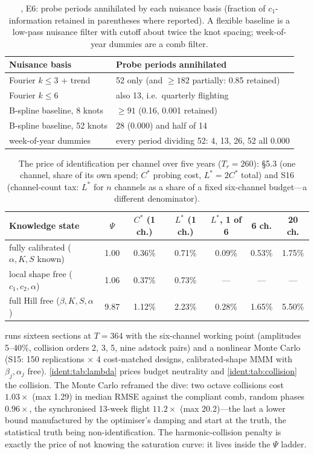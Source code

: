 \begin{table}[htbp]
\centering\small
\caption{, E6: probe periods annihilated by each nuisance basis (fraction of $c_1$-information retained in parentheses where reported). A flexible baseline is a low-pass nuisance filter with cutoff about twice the knot spacing; week-of-year dummies are a comb filter.}
\label{ident:tab:basis}
\begin{tabularx}{\textwidth}{lX}
\toprule
Nuisance basis & Probe periods annihilated \\
\midrule
Fourier $k \le 3$ + trend & 52 only (and $\ge 182$ partially: 0.85 retained) \\
Fourier $k \le 6$ & also 13, i.e.\ quarterly flighting \\
B-spline baseline, 8 knots & $\ge 91$ (0.16, 0.001 retained) \\
B-spline baseline, 52 knots & 28 (0.000) and half of 14 \\
week-of-year dummies & every period dividing 52: 4, 13, 26, 52 all 0.000 \\
\bottomrule
\end{tabularx}
\end{table}

\begin{table}[htbp]
\centering\small
\caption{The price of identification per channel over five years ($T_r = 260$):  \S5.3 (one channel, share of its own spend; $C^*$ probing cost, $L^* = 2C^*$ total) and  S16 (channel-count tax: $L^*$ for $n$ channels as a share of a fixed six-channel budget---a different denominator).}
\label{ident:tab:price}
\begin{tabular}{lcccccc}
\toprule
Knowledge state & $\Psi$ & $C^*$ (1 ch.) & $L^*$ (1 ch.) & $L^*$, 1 of 6 & 6 ch. & 20 ch. \\
\midrule
fully calibrated ($\alpha, K, S$ known) & 1.00 & 0.36\% & 0.71\% & 0.09\% & 0.53\% & 1.75\% \\
local shape free ($c_1, c_2, \alpha$) & 1.06 & 0.37\% & 0.73\% & --- & --- & --- \\
full Hill free ($\beta, K, S, \alpha$) & 9.87 & 1.12\% & 2.23\% & 0.28\% & 1.65\% & 5.50\% \\
\bottomrule
\end{tabular}
\end{table}

\emph{} runs sixteen sections at $T = 364$ with the six-channel working point (amplitudes 5--40\%, collision orders 2, 3, 5, nine adstock pairs) and a nonlinear Monte Carlo (S15: 150 replications $\times$ 4 cost-matched designs, calibrated-shape MMM with $\beta_j, \alpha_j$ free). \cref{ident:tab:lambda} prices budget neutrality and \cref{ident:tab:collision} the collision. The Monte Carlo reframed the dive: two octave collisions cost $1.03\times$ (max 1.29) in median RMSE against the compliant comb, random phases $0.96\times$, the synchronised 13-week flight $11.2\times$ (max 20.2)---the last a lower bound manufactured by the optimiser's damping and start at the truth, the statistical truth being non-identification. The harmonic-collision penalty is exactly the price of not knowing the saturation curve: it lives inside the $\Psi$ ladder.

